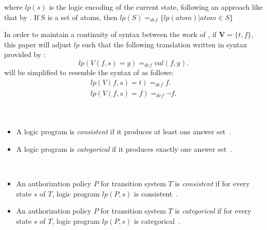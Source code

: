 \noindent
where $lp(s)$ is the logic encoding of the current state, following an approach like that by \citet{balduccini_aaa_2008}.
If S is a set of atoms, then $lp(S)=_{def}\{lp(atom) | atom \in S\}$

In order to maintain a continuity of syntax between the work of \citet{gelfond_action_1998,balduccini_aaa_2008,blount_architecture_2013,gelfond_authorization_2008}, if $\boldsymbol{V} = \{t,f\}$, this paper will adjust $lp$ such that the following translation written in syntax provided by \citet{gelfond_authorization_2008}:
\[
    lp\left(V(f,s)=y\right) =_{def}
        val\left(f,y\right).
\]
will be simplified to resemble the syntax of \citet{gelfond_action_1998,balduccini_aaa_2008,blount_architecture_2013} as follows:
\begin{gather}
    lp\left(V(f,s)=t\right) =_{def}
        f. \\
    lp\left(V(f,s)=f\right) =_{def}
        \neg f. \\
\end{gather}

\begin{definition}
    \label{def:lp_consistent}
    \label{def:lp_categorical}
    ~

    \begin{itemize}
        \item A logic program is \textit{consistent} if it produces at least one answer set~\citep{gelfond_authorization_2008}.
        \item A logic program is \textit{categorical} if it produces exactly one answer set~\citep{gelfond_authorization_2008}.
    \end{itemize}
\end{definition}

\begin{definition}
    \label{def:authorization_consistent}
    \label{def:authorization_categorical}
    ~

    \begin{itemize}
        \item An authorization policy $P$ for transition system $T$ is \textit{consistent} if for every state $s$ of $T$, logic program $lp(P, s)$ is consistent~\citep{gelfond_authorization_2008}.
        \item An authorization policy $P$ for transition system $T$ is \textit{categorical} if for every state $s$ of $T$, logic program $lp(P, s)$ is categorical~\citep{gelfond_authorization_2008}.
    \end{itemize}
\end{definition}

